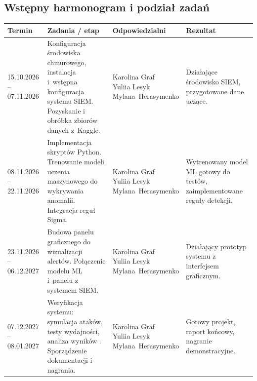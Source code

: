 \documentclass[11pt,a4paper,oneside]{article}
\newif\ifpodpowiedzi
\newcommand{\podpowiedz}[1]{\ifpodpowiedzi\par\begingroup\small\color{hintcolor}\textit{Wskazówka: #1}\par\endgroup\fi}
\begin{document}
\subsection{Wstępny harmonogram i podział zadań}
\podpowiedz{Podziel prace na etapy z konkretnymi terminami i sprawdzalnymi rezultatami. Wskaż osoby odpowiedzialne; przy zadaniach wspólnych określ indywidualne obowiązki. Uwzględnij czas na integrację, testy, dokumentację, nagranie i poprawki. W razie potrzeby dodaj wiersze.}
\begin{tabularx}{\textwidth}{@{}p{} Y p{0.21\textwidth} Y@{}}
\toprule
Termin & Zadania / etap & Odpowiedzialni & Rezultat\\
\midrule
{15.10.2026 -- 07.11.2026} & {Konfiguracja środowiska chmurowego, instalacja i~wstępna konfiguracja systemu SIEM. Pozyskanie i obróbka zbiorów danych z~Kaggle.} & {Karolina Graf \newline Yuliia Lesyk \newline \mbox{Mylana Herasymenko}} & {Działające środowisko SIEM, przygotowane dane uczące.}\\
{08.11.2026 -- 22.11.2026} & {Implementacja skryptów Python. Trenowanie modeli uczenia maszynowego do wykrywania anomalii. Integracja reguł Sigma.} & {Karolina Graf \newline Yuliia Lesyk \newline \mbox{Mylana Herasymenko}} & {Wytrenowany model ML gotowy do testów, zaimplementowane reguły detekcji.}\\
{23.11.2026 -- 06.12.2027} & {Budowa panelu graficznego do wizualizacji alertów. Połączenie modelu ML i~panelu z systemem SIEM.} & {Karolina Graf \newline Yuliia Lesyk \newline \mbox{Mylana Herasymenko}} & {Działający prototyp systemu z interfejsem graficznym.}\\
{07.12.2027 -- 08.01.2027} & {Weryfikacja systemu: symulacja ataków, testy wydajności, analiza wyników . Sporządzenie dokumentacji i nagrania.} & {Karolina Graf \newline Yuliia Lesyk \newline \mbox{Mylana Herasymenko}} & {Gotowy projekt, raport końcowy, nagranie demonstracyjne.}\\
\bottomrule
\end{tabularx}
\podpowiedz{Od trzeciego spotkania przygotowujcie wspólny raport za okres między poprzednim a bieżącym spotkaniem, z podziałem wykonanych prac na członków zespołu.}
\end{document}
